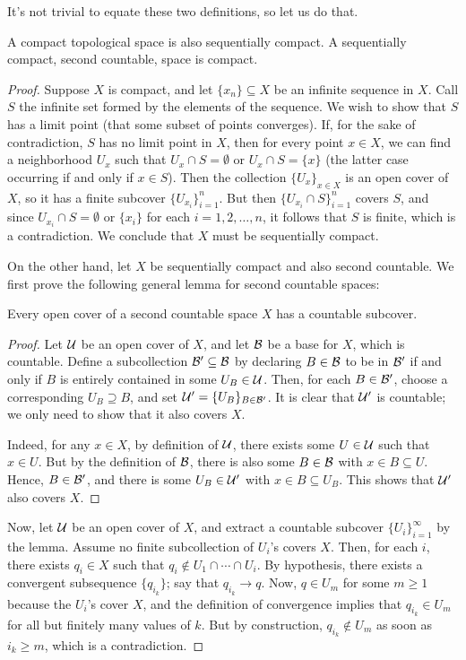 It's not trivial to equate these two definitions, so let us do that.
\begin{proposition}
	\label{prop:compact-seq}
	A compact topological space is also sequentially compact. A sequentially compact, second countable, space is compact.
\end{proposition}
\begin{proof}
	Suppose $X$ is compact, and let $\{x_n\} \subseteq X$ be an infinite sequence in $X$. Call $S$ the infinite set formed by the elements of the sequence. We wish to show that $S$ has a limit point (that some subset of points converges). If, for the sake of contradiction, $S$ has no limit point in $X$, then for every point $x \in X$, we can find a neighborhood $U_x$ such that $U_x \cap S=\emptyset$ or $U_x \cap S=\{x\}$ (the latter case occurring if and only if $x \in S$). Then the collection $\{U_x\}_{x \in X}$ is an open cover of $X$, so it has a finite subcover $\{U_{x_i}\}_{i=1}^{n}$. But then $\{U_{x_i} \cap S\}_{i=1}^{n}$ covers $S$, and since $U_{x_i} \cap S=\emptyset$ or $\{x_i\}$ for each $i=1,2,\dots,n$, it follows that $S$ is finite, which is a contradiction. We conclude that $X$ must be sequentially compact.
	
	On the other hand, let $X$ be sequentially compact and also second countable. We first prove the following general lemma for second countable spaces:
	\begin{lemma}
		Every open cover of a second countable space $X$ has a countable subcover.
	\end{lemma}
	\begin{proof}
		Let $\mathcal{U}$ be an open cover of $X$, and let $\mathcal{B}$ be a base for $X$, which is countable. Define a subcollection $\mathcal{B}' \subseteq \mathcal{B}$ by declaring $B \in \mathcal{B}$ to be in $\mathcal{B}'$ if and only if $B$ is entirely contained in some $U_B \in \mathcal{U}$. Then, for each $B \in \mathcal{B}'$, choose a corresponding $U_B \supseteq B$, and set $\mathcal{U}'=\{U_B\}_{B \in \mathcal{B}'}$. It is clear that $\mathcal{U}'$ is countable; we only need to show that it also covers $X$.
		
		Indeed, for any $x \in X$, by definition of $\mathcal{U}$, there exists some $U \in \mathcal{U}$ such that $x \in U$. But by the definition of $\mathcal{B}$, there is also some $B \in \mathcal{B}$ with $x \in B \subseteq U$. Hence, $B \in \mathcal{B}'$, and there is some $U_B \in \mathcal{U}'$ with $x \in B \subseteq U_B$. This shows that $\mathcal{U}'$ also covers $X$.
	\end{proof}
	
	Now, let $\mathcal{U}$ be an open cover of $X$, and extract a countable subcover $\{U_i\}_{i=1}^{\infty}$ by the lemma. Assume no finite subcollection of $U_i$'s covers $X$. Then, for each $i$, there exists $q_i \in X$ such that $q_i \notin U_1 \cap \cdots \cap U_i$. By hypothesis, there exists a convergent subsequence $\{q_{i_k}\}$; say that $q_{i_k} \rightarrow q$. Now, $q \in U_m$ for some $m \ge 1$ because the $U_i$'s cover $X$, and the definition of convergence implies that $q_{i_k} \in U_m$ for all but finitely many values of $k$. But by construction, $q_{i_k} \notin U_m$ as soon as $i_k \ge m$, which is a contradiction.
	

\end{proof}
